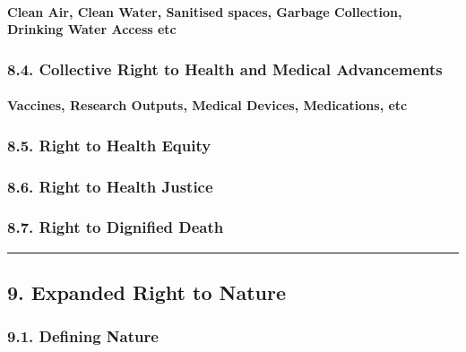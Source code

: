 \paragraph{Clean Air, Clean Water, Sanitised spaces, Garbage Collection,
Drinking Water Access
etc}\label{clean-air-clean-water-sanitised-spaces-garbage-collection-drinking-water-access-etc}

\subsubsection{8.4. Collective Right to Health and Medical
Advancements}\label{collective-right-to-health-and-medical-advancements}

\paragraph{Vaccines, Research Outputs, Medical Devices, Medications,
etc}\label{vaccines-research-outputs-medical-devices-medications-etc}

\subsubsection{8.5. Right to Health
Equity}\label{right-to-health-equity}

\subsubsection{8.6. Right to Health
Justice}\label{right-to-health-justice}

\subsubsection{8.7. Right to Dignified
Death}\label{right-to-dignified-death}

\begin{center}\rule{0.5\linewidth}{0.5pt}\end{center}

\subsection{9. Expanded Right to Nature}\label{expanded-right-to-nature}

\subsubsection{9.1. Defining Nature}\label{defining-nature}


